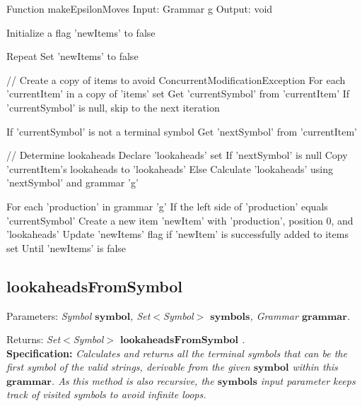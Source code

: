 \begin{codeblock}
    Function makeEpsilonMoves
    Input: Grammar g
    Output: void

    Initialize a flag 'newItems' to false

    Repeat
    Set 'newItems' to false

    // Create a copy of items to avoid ConcurrentModificationException
    For each 'currentItem' in a copy of 'items' set
    Get 'currentSymbol' from 'currentItem'
    If 'currentSymbol' is null, skip to the next iteration

    If 'currentSymbol' is not a terminal symbol
    Get 'nextSymbol' from 'currentItem'

    // Determine lookaheads
    Declare 'lookaheads' set
    If 'nextSymbol' is null
    Copy 'currentItem's lookaheads to 'lookaheads'
    Else
    Calculate 'lookaheads' using 'nextSymbol' and grammar 'g'

    For each 'production' in grammar 'g'
    If the left side of 'production' equals 'currentSymbol'
    Create a new item 'newItem' with 'production', position 0, and 'lookaheads'
    Update 'newItems' flag if 'newItem' is successfully added to items set
    Until 'newItems' is false
\end{codeblock}

\vspace{30pt}

\subsection{lookaheadsFromSymbol}

Parameters: \textit{Symbol \(\boldsymbol{symbol}\), Set\(<\)Symbol\(>\) \(\boldsymbol{symbols}\), Grammar \(\boldsymbol{grammar}\).}

Returns: \textit{Set\(<\)Symbol\(>\) \(\boldsymbol{lookaheadsFromSymbol}\) .}\\

\textbf{Specification:} \textit{Calculates and returns all the terminal symbols that can be the first symbol of the valid strings, derivable from the given \(\boldsymbol{symbol}\) within this \(\boldsymbol{grammar}\). As this method is also recursive, the \(\boldsymbol{symbols}\) input parameter keeps track of visited symbols to avoid infinite loops.}\\

